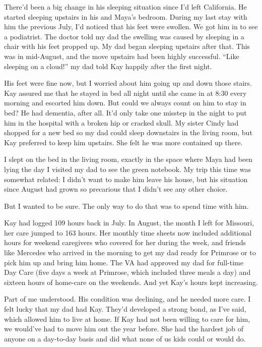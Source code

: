 \documentclass[12pt]{book}
\begin{document}
There'd been a big change in his sleeping situation since I'd left California. He started sleeping upstairs in his and Maya's bedroom. During my last stay with him the previous July, I'd noticed that his feet were swollen. We got him in to see a podiatrist. The doctor told my dad the swelling was caused by sleeping in a chair with his feet propped up. My dad began sleeping upstairs after that. This was in mid-August, and the move upstairs had been highly successful. ``Like sleeping on a cloud!'' my dad told Kay happily after the first night.

His feet were fine now, but I worried about him going up and down those stairs. Kay assured me that he stayed in bed all night until she came in at 8:30 every morning and escorted him down. But could we always count on him to stay in bed? He had dementia, after all. It'd only take one misstep in the night to put him in the hospital with a broken hip or cracked skull. My sister Cindy had shopped for a new bed so my dad could sleep downstairs in the living room, but Kay preferred to keep him upstairs. She felt he was more contained up there.

I slept on the bed in the living room, exactly in the space where Maya had been lying the day I visited my dad to see the green notebook. My trip this time was somewhat related: I didn't want to make him leave his house, but his situation since August had grown so precarious that I didn't see any other choice.

But I wanted to be sure. The only way to do that was to spend time with him.

Kay had logged 109 hours back in July. In August, the month I left for Missouri, her care jumped to 163 hours. Her monthly time sheets now included additional hours for weekend caregivers who covered for her during the week, and friends like Mercedes who arrived in the morning to get my dad ready for Primrose or to pick him up and bring him home. The VA had approved my dad for full-time Day Care (five days a week at Primrose, which included three meals a day) and sixteen hours of home-care on the weekends. And yet Kay's hours kept increasing.

Part of me understood. His condition was declining, and he needed more care. I felt lucky that my dad had Kay. They'd developed a strong bond, as I've said, which allowed him to live at home. If Kay had not been willing to care for him, we would've had to move him out the year before. She had the hardest job of anyone on a day-to-day basis and did what none of us kids could or would do.
\end{document}
